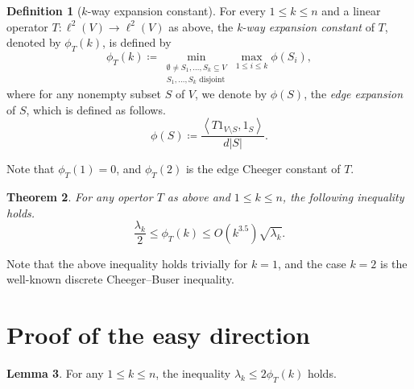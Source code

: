\documentclass[12pt,a4paper,bold]{thesis}
\newtheorem{thm}{Theorem}[chapter]
\theoremstyle{definition}
\newtheorem{defn}[thm]{Definition}
\newtheorem{lemma}[thm]{Lemma}
\newcommand*{\map}[3]{#1 \colon #2 \to #3}
\newcommand*{\ip}[2]{\left\langle #1 , #2 \right\rangle}
\begin{document}
\begin{defn}[$k$-way expansion constant]
	For every $1 \leq k \leq n$ and a linear operator $\map{T}{\ell^2(V)}{\ell^2(V)}$ 
    as above, the \emph{k-way expansion constant} of $T$, denoted by $\phi_T(k)$, 
    is defined by
	\begin{equation*}
    	\phi_T(k) \coloneq \min_{\substack{\emptyset \neq S_1, \dots, S_k \subseteq V \\ 
    	S_1, \dots, S_k \text{ disjoint}}} \max_{1 \leq i \leq k} \phi(S_i),
	\end{equation*}
	where for any nonempty subset $S$ of $V$, we denote by $\phi(S)$, 
	the \emph{edge expansion} of $S$, which is defined as follows.
	\begin{equation*}
		\phi(S) \coloneq \frac{\ip{T1_{V \setminus S}}{1_S}}{d|S|}.
	\end{equation*} 
\end{defn}

Note that $\phi_T(1) = 0$, and $\phi_T(2)$ is the edge Cheeger constant of $T$.

\begin{thm}
    For any opertor $T$ as above and $1 \leq k \leq n$, the following inequality holds.
    \begin{equation*}
        \frac{\lambda_k}{2} \leq \phi_T(k) \leq O(k^{3.5}) \sqrt{\lambda_k}.
    \end{equation*}
\end{thm}

Note that the above inequality holds trivially for $k = 1$, 
and the case $k = 2$ is the well-known discrete Cheeger--Buser inequality.

\section{Proof of the easy direction}

\begin{lemma}
    For any $1 \leq k \leq n$, the inequality $\lambda_k \leq 2 \phi_T(k)$ holds.
\end{lemma}
\end{document}
